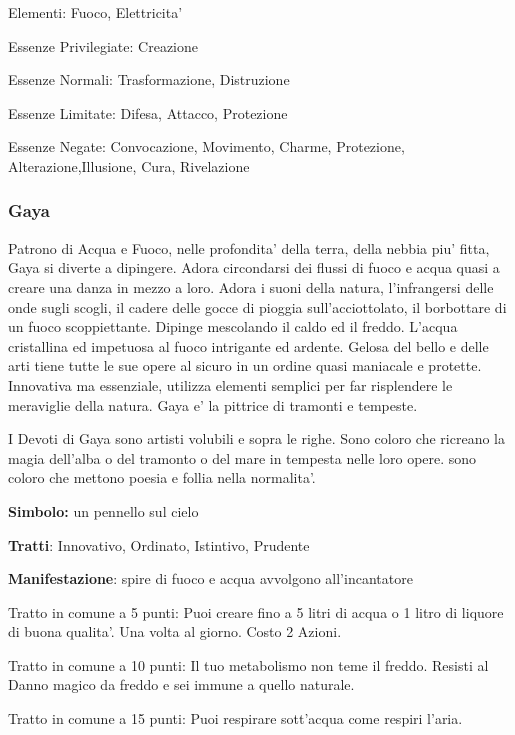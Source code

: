\documentclass[a4paper,11pt,twoside,openany]{book}
\begin{document}
{\bigskip

Elementi: Fuoco, Elettricita'

\bigskip

Essenze Privilegiate: Creazione

Essenze Normali: Trasformazione, Distruzione

Essenze Limitate: Difesa, Attacco, Protezione

Essenze Negate: Convocazione, Movimento, Charme, Protezione, Alterazione,Illusione, Cura, Rivelazione

\subsubsection{Gaya}

\label{gaya}

Patrono di Acqua e Fuoco, nelle profondita' della terra, della nebbia piu' fitta, Gaya si diverte a dipingere. Adora circondarsi dei flussi di fuoco e acqua quasi a creare una danza in mezzo a loro. Adora i suoni della natura, l'infrangersi delle onde sugli scogli, il cadere delle gocce di pioggia sull'acciottolato, il borbottare di un fuoco scoppiettante. Dipinge mescolando il caldo ed il freddo. L'acqua cristallina ed impetuosa al fuoco intrigante ed ardente. Gelosa del bello e delle arti tiene tutte le sue opere al sicuro in un ordine quasi maniacale e protette. Innovativa ma essenziale, utilizza elementi semplici per far risplendere le meraviglie della natura. Gaya e' la pittrice di tramonti e tempeste.

I Devoti di Gaya sono artisti volubili e sopra le righe. Sono coloro che ricreano la magia dell'alba o del tramonto o del mare in tempesta nelle loro opere. sono coloro che mettono poesia e follia nella normalita'. 

\textbf{Simbolo:} un pennello sul cielo

\textbf{Tratti}: Innovativo, Ordinato, Istintivo, Prudente

\textbf{Manifestazione}: spire di fuoco e acqua avvolgono all'incantatore

\bigskip

Tratto in comune a 5 punti: Puoi creare fino a 5 litri di acqua o 1 litro di liquore di buona qualita'. Una volta al giorno. Costo 2 Azioni.

Tratto in comune a 10 punti: Il tuo metabolismo non teme il freddo. Resisti al Danno magico da freddo e sei immune a quello naturale.

Tratto in comune a 15 punti: Puoi respirare sott'acqua come respiri l'aria.

}
\end{document}
